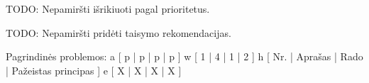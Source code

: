 TODO: Nepamiršti išrikiuoti pagal prioritetus.

TODO: Nepamiršti pridėti taisymo rekomendacijas.

Pagrindinės problemos:
\xtableu
{
  a [ p | p | p | p ]
  w [ 1 | 4 | 1 | 2 ]
  h [ Nr. | Aprašas | Rado | Pažeistas principas ]
  e [ X | X | X | X ]
}
